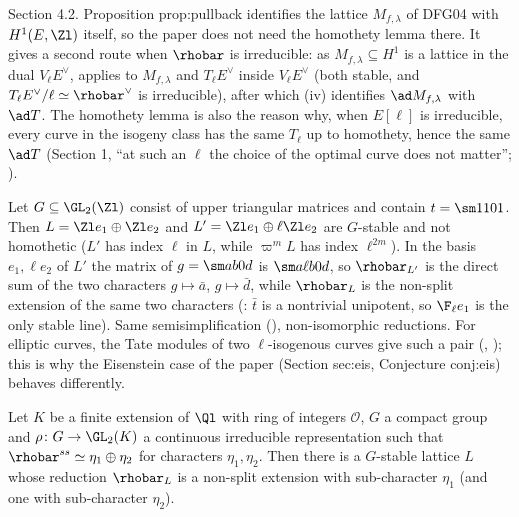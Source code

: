 \begin{paperlink}
Section 4.2. Proposition prop:pullback identifies the lattice $M_{f,\lambda}$ of DFG04 with $H^1(E,\Zl)$ itself, so the paper does not need the
homothety lemma there. It gives a second route when $\rhobar$ is irreducible: as $M_{f,\lambda}\subseteq H^1$ is a lattice in the dual $V_\ell E^\vee$,
 applies to $M_{f,\lambda}$ and $T_\ell E^\vee$ inside $V_\ell E^\vee$ (both stable, and $T_\ell E^\vee/\ell\simeq\rhobar^\vee$ is irreducible), after which
(iv) identifies $\ad M_{f,\lambda}$ with $\ad T$. The homothety lemma is also the reason why, when $E[\ell]$ is irreducible, every curve
in the isogeny class has the same $T_\ell$ up to homothety, hence the same $\ad T$ (Section 1, ``at such an $\ell$ the choice of the optimal curve does
not matter''; ).
\end{paperlink}

\begin{example}\label{ex:reps:nonhomothetic}
Let $G\subseteq\GL_2(\Zl)$ consist of upper triangular matrices and contain $t=\sm1101$. Then $L=\Zl e_1\oplus\Zl e_2$ and $L'=\Zl e_1\oplus\ell\Zl e_2$ are $G$-stable and
not homothetic ($L'$ has index $\ell$ in $L$, while $\varpi^mL$ has index $\ell^{2m}$). In the basis $e_1,\ell e_2$ of $L'$ the matrix of $g=\sm ab0d$ is $\sm a{\ell b}0d$, so
$\rhobar_{L'}$ is the direct sum of the two characters $g\mapsto\bar a$, $g\mapsto\bar d$, while $\rhobar_L$ is the non-split extension of the same two characters
(: $\bar t$ is a nontrivial unipotent, so $\F_\ell e_1$ is the only stable line). Same semisimplification
(), non-isomorphic reductions. For elliptic curves, the Tate modules of two $\ell$-isogenous curves give such a pair
(, ); this is why the Eisenstein case of the paper (Section sec:eis, Conjecture conj:eis) behaves
differently.
\end{example}

\begin{theorem}\label{thm:reps:ribet}
Let $K$ be a finite extension of $\Ql$ with ring of integers $\mathcal{O}$, $G$ a compact group and $\rho\colon G\to\GL_2(K)$ a continuous irreducible
representation such that $\rhobar^{ss}\simeq\eta_1\oplus\eta_2$ for characters $\eta_1,\eta_2$. Then there is a $G$-stable lattice $L$ whose reduction $\rhobar_L$ is a non-split
extension with sub-character $\eta_1$ (and one with sub-character $\eta_2$).
\end{theorem}

